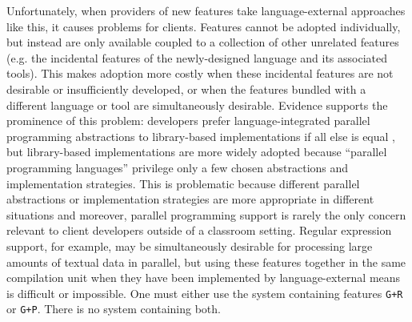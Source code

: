 Unfortunately, when providers of new features take language-external approaches like this, it causes  problems for clients. Features cannot be adopted individually, but instead are only available coupled to a collection of other unrelated  features (e.g. the incidental features of the newly-designed language and its associated tools). This makes adoption more costly when these incidental features are  not desirable or insufficiently developed, or when the features bundled with a different language or tool are simultaneously desirable. Evidence supports the prominence of this problem: developers prefer language-integrated parallel programming abstractions to library-based implementations if all else is equal \cite{cave2010comparing}, but library-based implementations are more widely adopted because ``parallel programming languages'' privilege only a few chosen  abstractions and implementation strategies. This is problematic because different parallel abstractions or implementation strategies are more appropriate in different situations \cite{Tasharofi:2013rc} and moreover,  parallel programming support is rarely the only concern relevant to client developers outside of a classroom setting. Regular expression support, for example, may be simultaneously desirable for processing large amounts of textual data in parallel, but using these features together in the same compilation unit when they have been implemented by language-external means is difficult or impossible. One must either use the system containing features \texttt{G+R} or \texttt{G+P}. There is no system containing both. %



